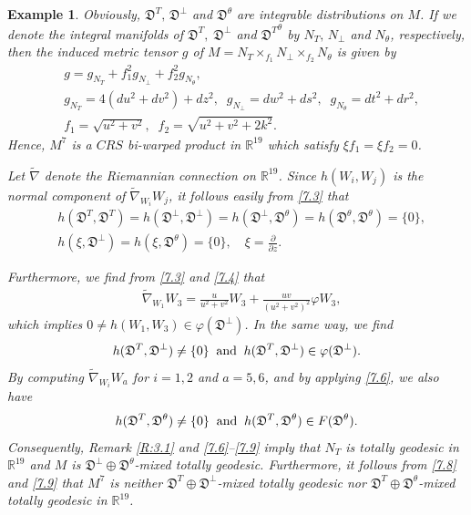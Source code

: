 \documentclass[reqno]{amsart}
\theoremstyle{plain}
\newtheorem{example}{Example}[section]
\theoremstyle{remark}
\numberwithin{equation}{section}
\def\e{\eqref}
\def\e{\eqref}
\begin{document}
\begin{example}
{Obviously, ${\mathfrak{D}^{T}},\, {\mathfrak{D}}^{\perp}$ and ${\mathfrak{D}}^{\theta}$ are integrable distributions on $M$.  If we denote the integral manifolds of ${\mathfrak{D}^{T}},\;{\mathfrak{D}}^\perp$ and ${\mathfrak{D}^{T}}^{\theta}$ by $N_T,\, N_\perp$ and $N_\theta$, respectively, then the induced metric tensor $g$ of $M= N_T\times_{f_1}N_\perp\times_{f_2} N_\theta$ is given by
\begin{equation}\begin{aligned}\label{7.5}
&g=g_{N_T}+f^2_1g_{N_\perp}+f^2_2g_{N_\theta},\\
&g_{N_T}=4(du^2+dv^2)+dz^2,\;\; g_{N_{\perp}}=dw^2+ds^2,\;\; g_{N_{\theta}}=dt^2+dr^2,
\\& f_{1}=\sqrt{u^{2}+ v^{2}}, \;\; f_2=\sqrt{u^2+v^2+2k^2}.
\end{aligned}\end{equation}
Hence, $M^{7}$ is a $CRS$ bi-warped product in ${\mathbb{R}}^{19}$ which satisfy $\xi f_{1}=\xi f_{2}=0$. 

Let $\widetilde \nabla$ denote the Riemannian connection on ${\mathbb{R}}^{19}$.
Since $h(W_{i},W_{j})$ is the normal component of $\widetilde \nabla_{W_{i}}W_{j}$, it follows easily from \e{7.3} that
\begin{align}\label{7.6} &h(\mathfrak{D}^{T}, \mathfrak{D}^{T})=h(\mathfrak{D}^{\perp}, \mathfrak{D}^{\perp})=h(\mathfrak{D}^{\perp}, \mathfrak{D}^{\theta})=h(\mathfrak{D}^{\theta}, \mathfrak{D}^{\theta})=\{0\},
\\&\label{7.6}h(\xi, \mathfrak{D}^{\perp})=h(\xi, \mathfrak{D}^{\theta})=\{0\},\quad \xi=\frac{\partial}{\partial z}.
\end{align}

  Furthermore, we find from \e{7.3} and \e{7.4} that 
\begin{align*}
&\widetilde \nabla_{W_{1}}W_{3}=\frac{u}{u^{2}+ v^{2}}W_{3}+\frac{uv}{(u^{2}+ v^{2})^{2}}\varphi W_{3},\end{align*}
which implies $0\ne h(W_{1},W_{3})\in \varphi(\mathfrak{D}^{\perp})$. In the same way, we  find
\begin{align}\label{7.8}
h({\mathfrak D}^{T}, \mathfrak{D}^\perp)\neq\{0\}\;\; {\rm and}\;\; h(\mathfrak{D}^{T}, \mathfrak{D}^{\perp})\in \varphi(\mathfrak{D}^{\perp}).
\end{align}
By computing  $\widetilde \nabla_{W_{i}}W_{a}$ for $i=1,2$ and $a=5,6$, and by applying \e{7.6}, we also have
\begin{align}\label{7.9}
h({\mathfrak D}^{T}, \mathfrak{D}^\theta)\neq\{0\}\;\; {\rm and}\;\; h(\mathfrak{D}^{T}, \mathfrak{D}^{\theta})\in F(\mathfrak{D}^{\theta}).
\end{align}
Consequently, Remark \ref{R:3.1} and \eqref{7.6}--\eqref{7.9} imply that $N_T$ is totally geodesic in $\mathbb{R}^{19}$ and $M$ is $\mathfrak{D}^\perp\oplus\mathfrak{D}^\theta$-mixed totally geodesic. Furthermore, it follows from \eqref{7.8} and \eqref{7.9} that $M^{7}$ is neither $\mathfrak{D}^{T}\oplus\mathfrak{D}^\perp$-mixed totally geodesic nor $\mathfrak{D}^{T}\oplus\mathfrak{D}^\theta$-mixed totally geodesic in ${\mathbb{R}}^{19}$.}
\end{example}
\end{document}

